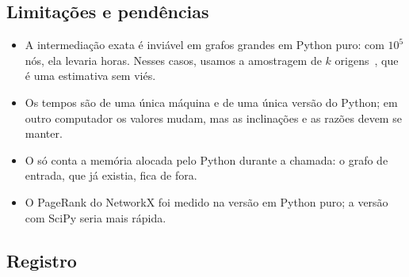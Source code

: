 \subsection{Limitações e pendências}
\begin{itemize}[leftmargin=*]
  \item A intermediação exata é inviável em grafos grandes em Python puro: com $10^5$ nós, ela levaria horas. Nesses casos, usamos a amostragem de $k$ origens~\cite{brandes2007}, que é uma estimativa sem viés.
  \item Os tempos são de uma única máquina e de uma única versão do Python; em outro computador os valores mudam, mas as inclinações e as razões devem se manter.
  \item O  só conta a memória alocada pelo Python durante a chamada: o grafo de entrada, que já existia, fica de fora.
  \item O PageRank do NetworkX foi medido na versão em Python puro; a versão com SciPy seria mais rápida.
\end{itemize}

\subsection{Registro}
\begin{description}[leftmargin=2.6cm,style=nextline]
\end{description}
